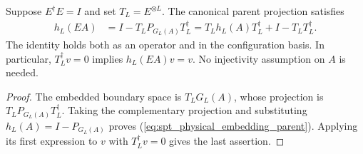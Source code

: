\begin{lemma}
    \label{thm:spt_physical_embedding_parent}
    \leanok
    Suppose $E^\dagger E=I$ and set $T_L=E^{\otimes L}$.
    The canonical parent projection satisfies
    \begin{align}
        h_L(EA)
         & =I-T_LP_{G_L(A)}T_L^\dagger
        =T_Lh_L(A)T_L^\dagger+I-T_LT_L^\dagger.
        \label{eq:spt_physical_embedding_parent}
    \end{align}
    The identity holds both as an operator and in the configuration basis.
    In particular, $T_L^\dagger v=0$ implies $h_L(EA)v=v$.
    No injectivity assumption on $A$ is needed.
\end{lemma}

\begin{proof}\leanok
    The embedded boundary space is $T_LG_L(A)$, whose projection is
    $T_LP_{G_L(A)}T_L^\dagger$. Taking the complementary projection
    and substituting $h_L(A)=I-P_{G_L(A)}$ proves
    (\ref{eq:spt_physical_embedding_parent}). Applying its first expression
    to $v$ with $T_L^\dagger v=0$ gives the last assertion.
\end{proof}

